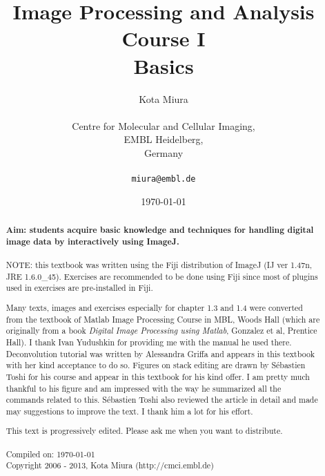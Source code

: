 \title{Image Processing and Analysis Course I\\
Basics}
\author{Kota Miura\\
\\
  Centre for Molecular and Cellular Imaging,\\
  EMBL Heidelberg,\\
  Germany\\
\\
\texttt{miura@embl.de}
}

\date{\today}

\pagestyle{empty}
\titleTH
\clearpage
\pagestyle{fancyplain}
\begin{abstract}
\HRule

\textbf{Aim: students acquire basic knowledge and techniques for handling
digital image data by interactively using ImageJ.} \\
\\

NOTE: this textbook was written using the Fiji distribution of ImageJ (IJ ver 1.47n, JRE 1.6.0\_45).
Exercises are recommended to be done using Fiji since most of plugins used in
exercises are pre-installed in Fiji.

Many texts, images and exercises especially for chapter 1.3 and 1.4 were
converted from the textbook of Matlab Image Processing Course in MBL, Woods Hall
(which are originally from a book \textit{Digital Image Processing
using Matlab}, Gonzalez et al, Prentice Hall). I thank Ivan Yudushkin for
providing me with the manual he used there.
Deconvolution tutorial was written by Alessandra Griffa and appears in this
textbook with her kind acceptance to do so.
Figures on stack editing are drawn by S\'{e}bastien Toshi for his course and appear in this textbook for his kind offer. I am pretty much thankful to his figure and am impressed with the way he summarized all the commands related to this.
S\'{e}bastien Toshi also reviewed the article in detail and made may suggestions to improve the text. I thank him a lot for his effort. 


This text is progressively edited. Please ask me when you want to distribute. \\
\\
Compiled on: \today \\
Copyright 2006 - 2013, Kota Miura (http://cmci.embl.de)

\HRule
\end{abstract}